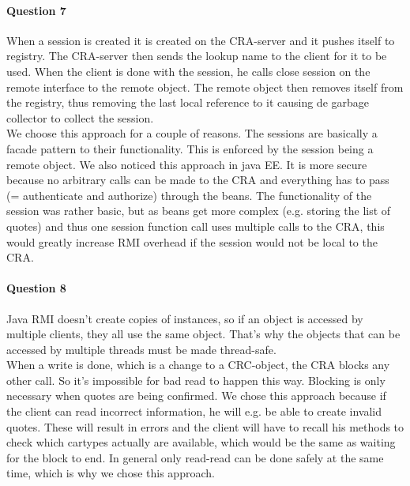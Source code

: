 \documentclass{ds-report}
\begin{document}
	\paragraph{Question 7} 
	When a session is created it is created on the CRA-server and it pushes itself to registry. The CRA-server then sends the lookup name to the client for it to be used. When the client is done with the session, he calls close session on the remote interface to the remote object. The remote object then removes itself from the registry, thus removing the last local reference to it causing de garbage collector to collect the session. \\
	
	We choose this approach for a couple of reasons.
	The sessions are basically a facade pattern to their functionality. This is enforced by the session being a remote object.
	We also noticed this approach in java EE.
	It is more secure because no arbitrary calls can be made to the CRA and everything has to pass (= authenticate and authorize) through the beans.
	The functionality of the session was rather basic, but as beans get more complex (e.g. storing the list of quotes) and thus one session function call uses multiple calls to the CRA, this would greatly increase RMI overhead if the session would not be local to the CRA.
	
	\paragraph{Question 8} 
	Java RMI doesn't create copies of instances, so if an object is accessed by multiple clients, they all use the same object. That's why the objects that can be accessed by multiple threads must be made thread-safe.\\
	
	
	When a write is done, which is a change to a CRC-object, the CRA blocks any other call. So it's impossible for bad read to happen this way. Blocking is only necessary when quotes are being confirmed. We chose this approach because if the client can read incorrect information, he will e.g. be able to create invalid quotes. These will result in errors and the client will have to recall his methods to check which cartypes actually are available, which would be the same as waiting for the block to end.
	In general only read-read can be done safely at the same time, which is why we chose this approach.
	 
	
\end{document}
